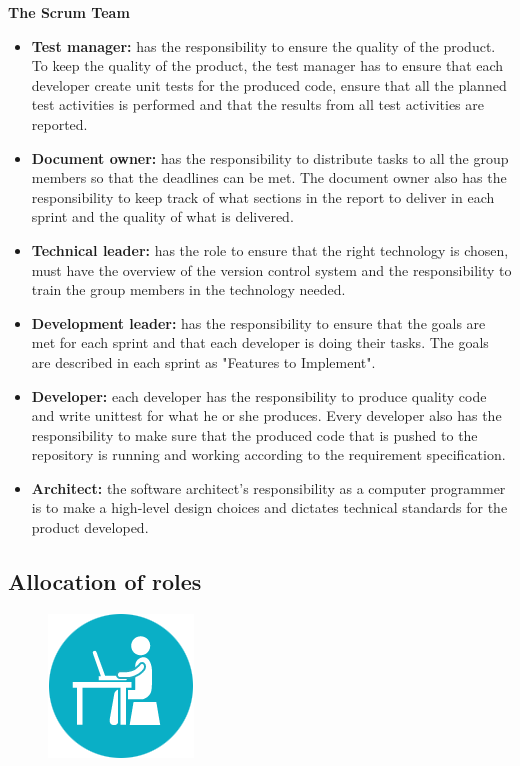 \noindent
{\bf The Scrum Team}
\begin{itemize}

  \item {\bf Test manager:} has the responsibility to ensure the quality of the product. To keep the quality of the product, the test manager has to ensure that each developer create unit tests for the produced code, ensure that all the planned test activities is performed and that the results from all test activities are reported.

  \item {\bf Document owner:} has the responsibility to distribute tasks to all the group members so that the deadlines can be met. The document owner also has the responsibility to keep track of what sections in the report to deliver in each sprint and the quality of what is delivered.

  \item {\bf Technical leader:} has the role to ensure that the right technology is chosen, must have the overview of the version control system and the responsibility to train the group members in the technology needed.

  \item {\bf Development leader:} has the responsibility to ensure that the goals are met for each sprint and that each developer is doing their tasks. The goals are described in each sprint as "Features to Implement". 

  \item {\bf Developer:} each developer has the responsibility to produce quality code and write unittest for what he or she produces. Every developer also has the responsibility to make sure that the produced code that is pushed to the repository is running and working according to the requirement specification.

  \item{\bf Architect:} the software architect's responsibility as a computer programmer is to make a high-level design choices and dictates technical standards for the product developed. \cite{architect}

  \end{itemize} 

\subsection{Allocation of roles}
\begin{figure}
  \begin{center}
  \includegraphics[scale=0.7]{pictures/Work.png}
  \end{center}
\end{figure}

